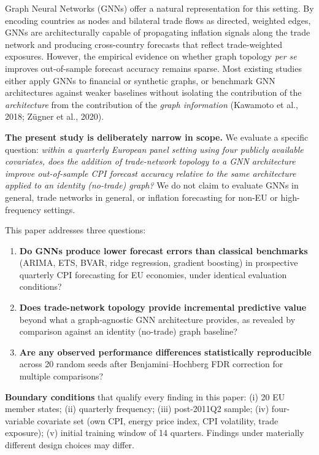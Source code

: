 \documentclass[
]{article}
\providecommand{\tightlist}{%
  \setlength{\itemsep}{0pt}\setlength{\parskip}{0pt}}
\begin{document}
Graph Neural Networks (GNNs) offer a natural representation for this setting. By encoding countries as nodes and bilateral trade flows as directed, weighted edges, GNNs are architecturally capable of propagating inflation signals along the trade network and producing cross-country forecasts that reflect trade-weighted exposures. However, the empirical evidence on whether graph topology \emph{per se} improves out-of-sample forecast accuracy remains sparse. Most existing studies either apply GNNs to financial or synthetic graphs, or benchmark GNN architectures against weaker baselines without isolating the contribution of the \emph{architecture} from the contribution of the \emph{graph information} (Kawamoto et al., 2018; Zügner et al., 2020).

\textbf{The present study is deliberately narrow in scope.} We evaluate a specific question: \emph{within a quarterly European panel setting using four publicly available covariates, does the addition of trade-network topology to a GNN architecture improve out-of-sample CPI forecast accuracy relative to the same architecture applied to an identity (no-trade) graph?} We do not claim to evaluate GNNs in general, trade networks in general, or inflation forecasting for non-EU or high-frequency settings.

This paper addresses three questions:

\begin{enumerate}
\def\labelenumi{\arabic{enumi}.}
\tightlist
\item
  \textbf{Do GNNs produce lower forecast errors than classical benchmarks} (ARIMA, ETS, BVAR, ridge regression, gradient boosting) in prospective quarterly CPI forecasting for EU economies, under identical evaluation conditions?
\item
  \textbf{Does trade-network topology provide incremental predictive value} beyond what a graph-agnostic GNN architecture provides, as revealed by comparison against an identity (no-trade) graph baseline?
\item
  \textbf{Are any observed performance differences statistically reproducible} across 20 random seeds after Benjamini–Hochberg FDR correction for multiple comparisons?
\end{enumerate}

\textbf{Boundary conditions} that qualify every finding in this paper: (i) 20 EU member states; (ii) quarterly frequency; (iii) post-2011Q2 sample; (iv) four-variable covariate set (own CPI, energy price index, CPI volatility, trade exposure); (v) initial training window of 14 quarters. Findings under materially different design choices may differ.
\end{document}
